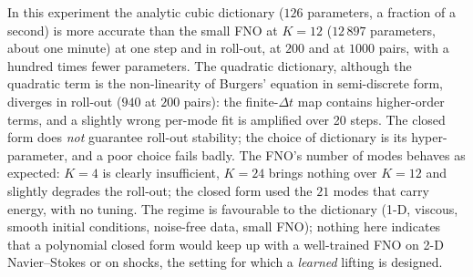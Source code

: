 \documentclass[11pt,a4paper]{article}
\theoremstyle{plain}
\theoremstyle{definition}
\theoremstyle{remark}
\begin{document}
In this experiment the analytic cubic dictionary ($126$ parameters, a
fraction of a second) is more accurate than the small FNO at $K=12$
($12\,897$ parameters, about one minute) at one step and in roll-out, at
$200$ and at $1000$ pairs, with a hundred times fewer parameters. The
quadratic dictionary, although the quadratic term is the non-linearity of
Burgers' equation in semi-discrete form, diverges in roll-out ($940$ at
$200$ pairs): the finite-$\Delta t$ map contains higher-order terms, and a
slightly wrong per-mode fit is amplified over 20 steps. The closed form does
\emph{not} guarantee roll-out stability; the choice of dictionary is its
hyper-parameter, and a poor choice fails badly. The FNO's number of modes
behaves as expected: $K=4$ is clearly insufficient, $K=24$ brings nothing
over $K=12$ and slightly degrades the roll-out; the closed form used the
$21$ modes that carry energy, with no tuning. The regime is favourable to
the dictionary (1-D, viscous, smooth initial conditions, noise-free data,
small FNO); nothing here indicates that a polynomial closed form would keep
up with a well-trained FNO on 2-D Navier--Stokes or on shocks, the setting
for which a \emph{learned} lifting is designed.
\end{document}
